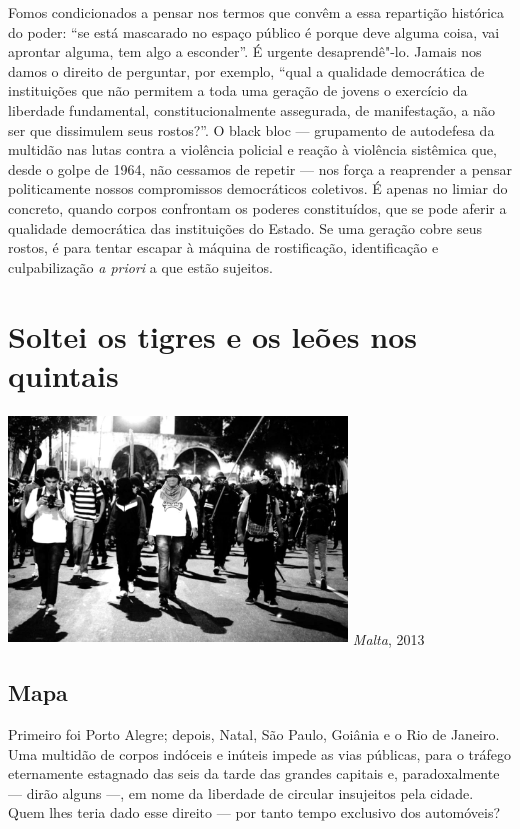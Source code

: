 Fomos condicionados a pensar nos termos que convêm a essa repartição
histórica do poder: ``se está mascarado no espaço público é porque deve
alguma coisa, vai aprontar alguma, tem algo a esconder''. É urgente
desaprendê"-lo. Jamais nos damos o direito de perguntar, por exemplo,
``qual a qualidade democrática de instituições que não permitem a toda
uma geração de jovens o exercício da liberdade fundamental,
constitucionalmente assegurada, de manifestação, a não ser que
dissimulem seus rostos?''. O black bloc --- grupamento de autodefesa da
multidão nas lutas contra a violência policial e reação à violência
sistêmica que, desde o golpe de 1964, não cessamos de repetir --- nos
força a reaprender a pensar politicamente nossos compromissos
democráticos coletivos. É apenas no limiar do concreto, quando corpos
confrontam os poderes constituídos, que se pode aferir a qualidade
democrática das instituições do Estado. Se uma geração cobre seus
rostos, é para tentar escapar à máquina de rostificação, identificação e
culpabilização \emph{a priori} a que estão sujeitos.

\section{Soltei os tigres e os leões nos quintais}

\begin{center}
\includegraphics[width=9cm,height=6.1cm]{Imgs/img4.jpg}
\emph{Malta}, 2013
\end{center}

\subsection{Mapa}

Primeiro foi Porto Alegre; depois, Natal, São
Paulo, Goiânia e o Rio de Janeiro. Uma multidão de corpos indóceis e
inúteis impede as vias públicas, para o tráfego eternamente estagnado
das seis da tarde das grandes capitais e, paradoxalmente --- dirão alguns
---, em nome da liberdade de circular insujeitos pela cidade. Quem lhes
teria dado esse direito --- por tanto tempo exclusivo dos automóveis?

